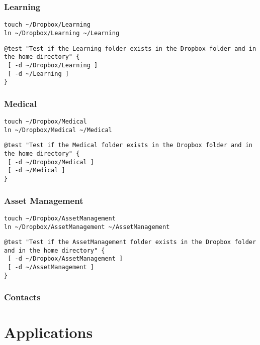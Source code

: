 \documentclass[11pt]{article}
\begin{document}
\subsubsection{Learning}
\label{sec:org3b06697}
\begin{verbatim}
touch ~/Dropbox/Learning
ln ~/Dropbox/Learning ~/Learning
\end{verbatim}

\begin{verbatim}
@test "Test if the Learning folder exists in the Dropbox folder and in the home directory" {
 [ -d ~/Dropbox/Learning ]
 [ -d ~/Learning ]
}
\end{verbatim}

\subsubsection{Medical}
\label{sec:org5d42a16}
\begin{verbatim}
touch ~/Dropbox/Medical
ln ~/Dropbox/Medical ~/Medical
\end{verbatim}

\begin{verbatim}
@test "Test if the Medical folder exists in the Dropbox folder and in the home directory" {
 [ -d ~/Dropbox/Medical ]
 [ -d ~/Medical ]
}
\end{verbatim}

\subsubsection{Asset Management}
\label{sec:org639e493}
\begin{verbatim}
touch ~/Dropbox/AssetManagement
ln ~/Dropbox/AssetManagement ~/AssetManagement
\end{verbatim}

\begin{verbatim}
@test "Test if the AssetManagement folder exists in the Dropbox folder and in the home directory" {
 [ -d ~/Dropbox/AssetManagement ]
 [ -d ~/AssetManagement ]
}
\end{verbatim}

\subsubsection{Contacts}
\label{sec:org05b6a59}

\section{Applications}
\label{sec:org010d6fe}
\end{document}
